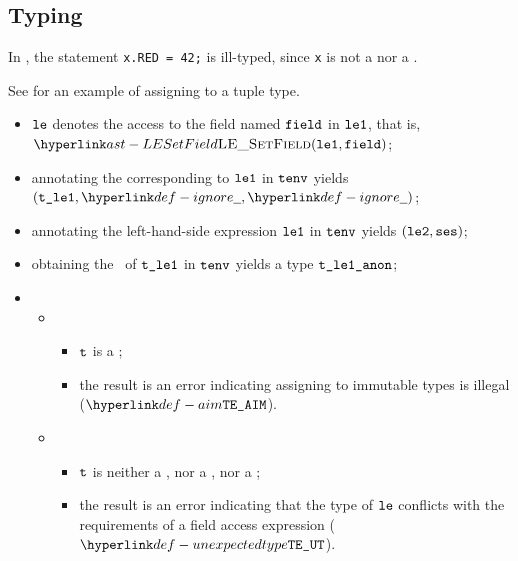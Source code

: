 \subsection{Typing}
In , the statement \verb|x.RED = 42;| is ill-typed,
since \verb|x| is not a \bitvectortypeterm{} nor a \structuredtype.

See  for an example of assigning to a tuple type.

\ProseParagraph
\AllApply
\begin{itemize}
  \item $\texttt{le}$ denotes the access to the field named $\texttt{field}$ in $\texttt{le1}$, that is, \\ $\LESetField(\vleone, \vfield)$;
  \item annotating the \rhsexpression{} corresponding to $\texttt{le1}$ in $\texttt{tenv}$ yields \\ $(\vtleone, \Ignore, \Ignore)$\ProseOrTypeError;
  \item annotating the left-hand-side expression $\texttt{le1}$ in $\texttt{tenv}$ yields $(\texttt{le2}, \texttt{ses})$\ProseOrTypeError;
  \item obtaining the \underlyingtype\ of $\texttt{t\_le1}$ in $\texttt{tenv}$ yields a type $\texttt{t\_le1\_anon}$\ProseOrTypeError;
  \item \OneApplies
  \begin{itemize}
    \item {}
    \begin{itemize}
      \item $\texttt{t}$ is a \tupletypeterm;
      \item the result is an error indicating assigning to immutable types is illegal ($\AssignmentToImmutable$).
    \end{itemize}

    \item {}
    \begin{itemize}
      \item $\texttt{t}$ is neither a \tupletypeterm{}, nor a \structuredtype, nor a \bitvectortypeterm;
      \item the result is an error indicating that the type of $\texttt{le}$ conflicts with the requirements
            of a field access expression ($\UnexpectedType$).
    \end{itemize}
  \end{itemize}
\end{itemize}

